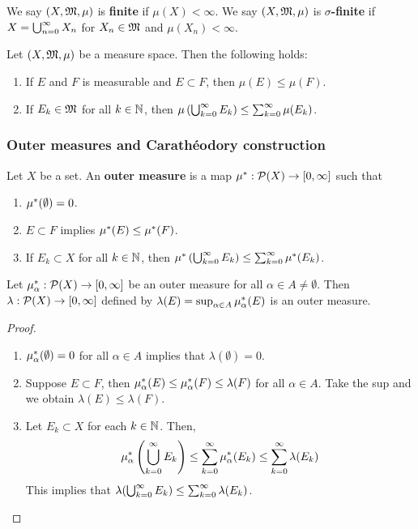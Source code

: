 \documentclass[a4paper]{article}
\begin{document}
\begin{defi}
  We say $(X, \mf, \mu)$ is \textbf{finite} if
  $\mu(X) < \infty$. We say $(X, \mf, \mu)$ is
  \textbf{$\sigma$-finite} if $X = \cupinfn X_n$ for
  $X_n \in \mf$ and $\mu(X_n) < \infty$.
\end{defi}

\begin{thm}
  Let $(X, \mf, \mu)$ be a measure space. Then the
  following holds:
  \begin{enumerate}
    \item If $E$ and $F$ is measurable and $E \subset F$,
    then $\mu(E) \leq \mu(F)$.

    \item If $E_k \in \mf$ for all $k \in \N$, then
    $\mu \left( \cupinfk E_k \right) \leq \suminfk \mu(E_k)$.
  \end{enumerate}
\end{thm}

\subsubsection{Outer measures and Carath\'eodory construction}

\begin{defi}
  Let $X$ be a set. An \textbf{outer measure} is a map
  $\om: \P(X) \to [0, \infty]$ such that
  \begin{enumerate}
    \item $\om(\emptyset) = 0$.
    \item $E \subset F$ implies $\om(E) \leq \om(F)$.
    \item If $E_k \subset X$ for all $k \in \N$, then
    $\om \left( \cupinfk E_k \right) \leq \suminfk \om(E_k)$.
  \end{enumerate}
\end{defi}

\begin{prop}
  Let $\om_\alpha: \P(X) \to [0, \infty]$ be an outer
  measure for all $\alpha \in A \neq \emptyset$.
  Then $\lambda: \P(X) \to [0, \infty]$ defined by
  $\lambda(E) = \sup_{\alpha \in A} \om_\alpha(E)$
  is an outer measure.
\end{prop}

\begin{proof}
\begin{enumerate}
  \item $\om_\alpha(\emptyset) = 0$ for all $\alpha \in A$
  implies that $\lambda(\emptyset) = 0$.

  \item Suppose $E \subset F$, then $\om_\alpha(E)
  \leq \om_\alpha(F) \leq \lambda(F)$ for all $\alpha \in A$.
  Take the sup and we obtain $\lambda(E) \leq \lambda(F)$.

  \item Let $E_k \subset X$ for each $k \in \N$.
  Then,
  \[
  \om_\alpha \left( \cupinfk E_k \right)
  \leq \suminfk \om_\alpha (E_k)
  \leq \suminfk \lambda(E_k)
  \]
  This implies that $\lambda(\cupinfk E_k) \leq \suminfk
  \lambda(E_k)$.
\end{enumerate}
\end{proof}
\end{document}
